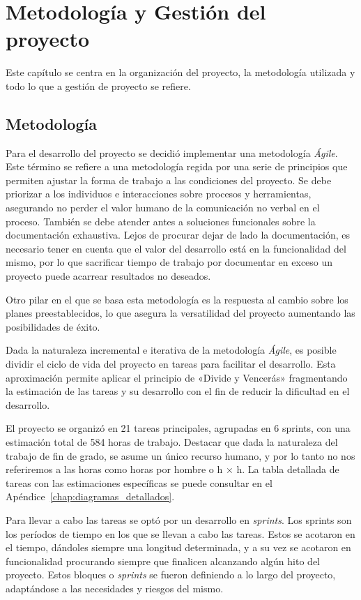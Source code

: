 \chapter{Metodología y Gestión del proyecto}
\label{chap:mygp}
Este capítulo se centra en la organización del proyecto, la metodología utilizada y todo lo que a gestión de proyecto se refiere.
\section{Metodología}
Para el desarrollo del proyecto se decidió implementar una metodología \textit{Ágile}. Este término se refiere a una metodología regida por una serie de principios que permiten ajustar la forma de trabajo a las condiciones del proyecto. Se debe priorizar a los individuos e interacciones sobre procesos y herramientas, asegurando no perder el valor humano de la comunicación no verbal en el proceso. También se debe atender antes a soluciones funcionales sobre la documentación exhaustiva. Lejos de procurar dejar de lado la documentación, es necesario tener en cuenta que el valor del desarrollo está en la funcionalidad del mismo, por lo que sacrificar tiempo de trabajo por documentar en exceso un proyecto puede acarrear resultados no deseados.

Otro pilar en el que se basa esta metodología es la respuesta al cambio sobre los planes preestablecidos, lo que asegura la versatilidad del proyecto aumentando las posibilidades de éxito.

Dada la naturaleza incremental e iterativa de la metodología \textit{Ágile}, es posible dividir el ciclo de vida del proyecto en tareas para facilitar el desarrollo. Esta aproximación permite aplicar el principio de «Divide y Vencerás» fragmentando la estimación de las tareas y su desarrollo con el fin de reducir la dificultad en el desarrollo. 

El proyecto se organizó en 21 tareas principales, agrupadas en 6 sprints, con una estimación total de 584 horas de trabajo. Destacar que dada la naturaleza del trabajo de fin de grado, se asume un único recurso humano, y por lo tanto no nos referiremos a las horas como horas por hombre o h × h. La tabla detallada de tareas con las estimaciones específicas se puede consultar en el Apéndice~\ref{chap:diagramas_detallados}.

Para llevar a cabo las tareas se optó por un desarrollo en \textit{sprints}. Los sprints son los períodos de tiempo en los que se llevan a cabo las tareas. Estos se acotaron en el tiempo, dándoles siempre una longitud determinada, y a su vez se acotaron en funcionalidad procurando siempre que finalicen alcanzando algún hito del proyecto. Estos bloques o \textit{sprints} se fueron definiendo a lo largo del proyecto, adaptándose a las necesidades y riesgos del mismo.

